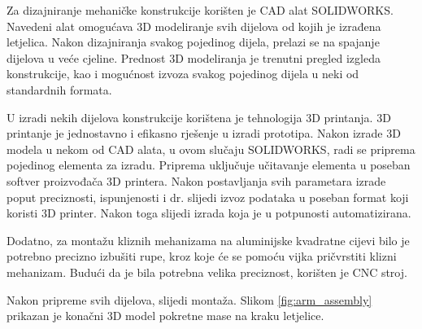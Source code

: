 \documentclass[11pt,a4paper]{article}
\begin{document}
Za dizajniranje mehaničke konstrukcije korišten je CAD alat SOLIDWORKS. Navedeni alat omogućava 3D modeliranje svih dijelova od kojih je izrađena letjelica. Nakon dizajniranja svakog pojedinog dijela, prelazi se na spajanje dijelova u veće cjeline. Prednost 3D modeliranja je trenutni pregled izgleda konstrukcije, kao i mogućnost izvoza svakog pojedinog dijela u neki od standardnih formata. 

U izradi nekih dijelova konstrukcije korištena je tehnologija 3D printanja. 3D printanje je jednostavno i efikasno rješenje u izradi prototipa. Nakon izrade 3D modela u nekom od CAD alata, u ovom slučaju SOLIDWORKS, radi se priprema pojedinog elementa za izradu. Priprema uključuje učitavanje elementa u poseban softver proizvođača 3D printera. Nakon postavljanja svih parametara izrade poput preciznosti, ispunjenosti i dr. slijedi izvoz podataka u poseban format koji koristi 3D printer. Nakon toga slijedi izrada koja je u potpunosti automatizirana.

Dodatno, za montažu kliznih mehanizama na aluminijske kvadratne cijevi bilo je potrebno precizno izbušiti rupe, kroz koje će se pomoću vijka pričvrstiti klizni mehanizam. Budući da je bila potrebna velika preciznost, korišten je CNC stroj.

Nakon pripreme svih dijelova, slijedi montaža. Slikom \ref{fig:arm_assembly} prikazan je konačni 3D model pokretne mase na kraku letjelice.
\end{document}
